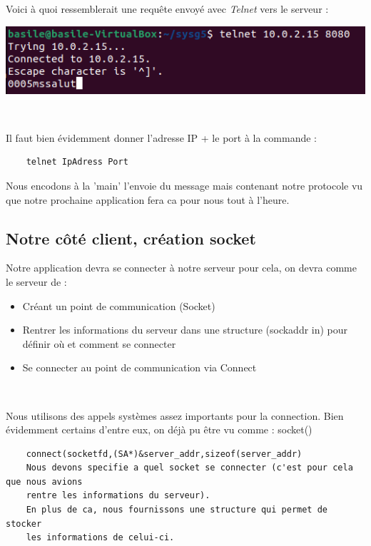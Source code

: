 Voici à quoi ressemblerait une requête envoyé avec \textit{Telnet} vers le serveur :

    {
    \centering
    \includegraphics[width=18cm]{figures/example_telnet_conn.png}
    \par
    } \hfill \\ \par

Il faut bien évidemment donner l'adresse IP + le port à la commande :
\begin{lstlisting}
    telnet IpAdress Port
\end{lstlisting}

Nous encodons à la 'main' l'envoie du message mais contenant notre protocole vu que notre prochaine application fera ca pour nous tout à l'heure.

\subsection{Notre côté client, création socket}

Notre application devra se connecter à notre serveur pour cela, on devra comme le serveur de :
\begin{itemize}
\item Créant un point de communication (Socket)
\item Rentrer les informations du serveur dans une structure (sockaddr in) pour définir où et comment se connecter
\item Se connecter  au point de communication via Connect
\end{itemize}

 \hfill \\ \par

Nous utilisons des appels systèmes assez importants pour la connection. Bien évidemment certains d'entre eux, on déjà pu être vu comme : socket()

\begin{lstlisting}
    connect(socketfd,(SA*)&server_addr,sizeof(server_addr)
    Nous devons specifie a quel socket se connecter (c'est pour cela que nous avions 
    rentre les informations du serveur).
    En plus de ca, nous fournissons une structure qui permet de stocker 
    les informations de celui-ci.
\end{lstlisting} \hfill \\ \par


